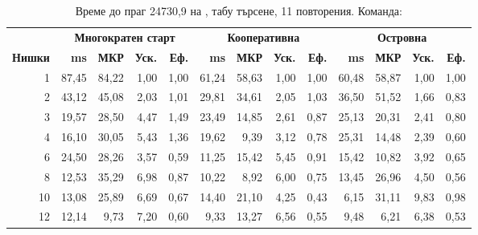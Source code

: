 \begin{table}[htbp]
\centering
\renewcommand{\arraystretch}{0.9}
\caption{Време до праг 24730,9 на , табу търсене, 11 повторения. Команда: }
\label{tab:speedup}
\begin{adjustbox}{max width=\textwidth}
\begin{tabular}{@{}r|rrrr|rrrr|rrrr@{}}
\toprule
& \multicolumn{4}{c|}{\textbf{Многократен старт}} & \multicolumn{4}{c|}{\textbf{Кооперативна}} & \multicolumn{4}{c}{\textbf{Островна}} \\
\textbf{Нишки} & \textbf{ms} & \textbf{МКР} & \textbf{Уск.} & \textbf{Еф.}
               & \textbf{ms} & \textbf{МКР} & \textbf{Уск.} & \textbf{Еф.}
               & \textbf{ms} & \textbf{МКР} & \textbf{Уск.} & \textbf{Еф.} \\
\midrule
1  & 87,45 & 84,22 & 1,00 & 1,00 & 61,24 & 58,63 & 1,00 & 1,00 & 60,48 & 58,87 & 1,00 & 1,00 \\
2  & 43,12 & 45,08 & 2,03 & 1,01 & 29,81 & 34,61 & 2,05 & 1,03 & 36,50 & 51,52 & 1,66 & 0,83 \\
3  & 19,57 & 28,50 & 4,47 & 1,49 & 23,49 & 14,85 & 2,61 & 0,87 & 25,13 & 20,31 & 2,41 & 0,80 \\
4  & 16,10 & 30,05 & 5,43 & 1,36 & 19,62 & 9,39  & 3,12 & 0,78 & 25,31 & 14,48 & 2,39 & 0,60 \\
6  & 24,50 & 28,26 & 3,57 & 0,59 & 11,25 & 15,42 & 5,45 & 0,91 & 15,42 & 10,82 & 3,92 & 0,65 \\
8  & 12,53 & 35,29 & 6,98 & 0,87 & 10,22 & 8,92  & 6,00 & 0,75 & 13,45 & 26,96 & 4,50 & 0,56 \\
10 & 13,08 & 25,89 & 6,69 & 0,67 & 14,40 & 21,10 & 4,25 & 0,43 & 6,15  & 31,11 & 9,83 & 0,98 \\
12 & 12,14 & 9,73  & 7,20 & 0,60 & 9,33  & 13,27 & 6,56 & 0,55 & 9,48  & 6,21  & 6,38 & 0,53 \\
\bottomrule
\end{tabular}
\end{adjustbox}
\end{table}

